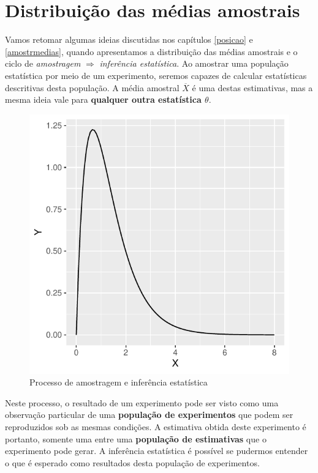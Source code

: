 \documentclass[
]{book}
\begin{document}
\hypertarget{tcl}{%
\chapter{Distribuição das médias amostrais}\label{tcl}}

Vamos retomar algumas ideias discutidas nos capítulos \ref{posicao} e \ref{amostrmedias}, quando apresentamos a distribuição das médias amostrais e o ciclo de \emph{amostragem} \(\Rightarrow\) \emph{inferência estatística}. Ao amostrar uma população estatística por meio de um experimento, seremos capazes de calcular estatísticas descritivas desta população. A média amostral \(\overline{X}\) é uma destas estimativas, mas a mesma ideia vale para \textbf{qualquer outra estatística \(\theta\)}.

\begin{figure}

{\centering \includegraphics[width=20.83in]{probest-cambientais_files/figure-latex/unnamed-chunk-224-1} 

}

\caption{Processo de amostragem e inferência estatística}\label{fig:unnamed-chunk-224}
\end{figure}

Neste processo, o resultado de um experimento pode ser visto como uma observação particular de uma \textbf{população de experimentos} que podem ser reproduzidos sob as mesmas condições. A estimativa obtida deste experimento é portanto, somente uma entre uma \textbf{população de estimativas} que o experimento pode gerar. A inferência estatística é possível se pudermos entender o que é esperado como resultados desta população de experimentos.
\end{document}
